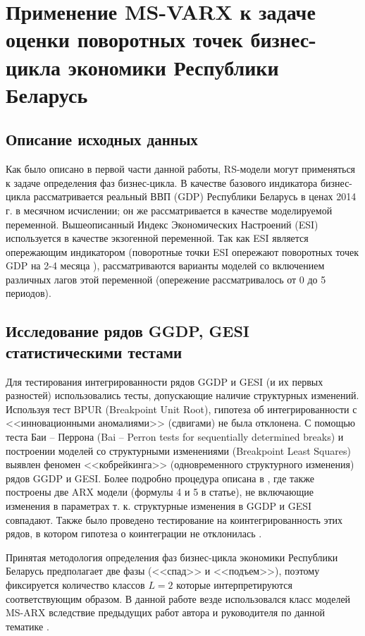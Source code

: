 \documentclass[a4paper,14pt]{extreport}
\begin{document}
\chapter{Применение MS-VARX к задаче оценки поворотных точек бизнес-цикла экономики Республики Беларусь}



\section{Описание исходных данных}

Как было описано в первой части данной работы, RS-модели могут применяться к задаче определения фаз бизнес-цикла. В качестве базового индикатора бизнес-цикла рассматривается реальный ВВП (GDP) Республики Беларусь в ценах 2014 г. в месячном исчислении; он же рассматривается в качестве моделируемой переменной. Вышеописанный Индекс Экономических Настроений (ESI) используется в качестве экзогенной переменной. Так как ESI является опережающим индикатором (поворотные точки ESI опережают поворотных точек GDP на 2-4 месяца \cite{esiMaking,esiExtra}), рассматриваются варианты моделей со включением различных лагов этой переменной (опережение рассматривалось от 0 до 5 периодов).


\section{Исследование рядов GGDP, GESI статистическими тестами}

Для тестирования интегрированности рядов GGDP и GESI (и их первых разностей) использовались тесты, допускающие наличие структурных изменений. Используя тест BPUR (Breakpoint Unit Root), гипотеза об интегрированности с <<инновационными аномалиями>> (сдвигами) не была отклонена. С помощью теста Баи – Перрона (Bai – Perron tests for sequentially determined breaks) и построении моделей со структурными изменениями (Breakpoint Least Squares) выявлен феномен <<кобрейкинга>> (одновременного структурного изменения) рядов GGDP и GESI. Более подробно процедура описана в \cite{mak_mal_bv_2020}, где также построены две ARX модели (формулы 4 и 5 в статье), не включающие изменения в параметрах т. к.  структурные изменения в GGDP и GESI совпадают. Также было проведено тестирование на коинтегрированность этих рядов, в котором гипотеза о коинтеграции не отклонилась \cite{mak_mal_bv_2020}. 

Принятая методология определения фаз бизнес-цикла экономики Республики Беларусь предполагает две фазы (<<спад>> и <<подъем>>), поэтому фиксируется количество классов $L=2$ которые интерпретируются соответствующим образом. В данной работе везде использовался класс моделей MS-ARX вследствие предыдущих работ автора и руководителя по данной тематике \cite{mak_mal_bv_2018,malVARforCycles}.
\end{document}
